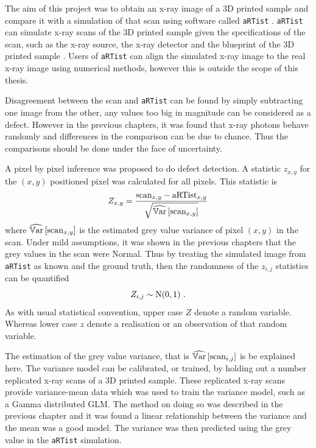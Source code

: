 The aim of this project was to obtain an x-ray image of a 3D printed sample and compare it with a simulation of that scan using software called \texttt{aRTist} \citep{bellon2007artist, jaenisch2008artist, bellon2012radiographic}. \texttt{aRTist} can simulate x-ray scans of the 3D printed sample given the specifications of the scan, such as the x-ray source, the x-ray detector and the blueprint of the 3D printed sample \citep{bellon2011simulation, deresch2012simulating}. Users of \texttt{aRTist} can align the simulated x-ray image to the real x-ray image using numerical methods, however this is outside the scope of this thesis.

Disagreement between the scan and \texttt{aRTist} can be found by simply subtracting one image from the other, any values too big in magnitude can be considered as a defect. However in the previous chapters, it was found that x-ray photons behave randomly and differences in the comparison can be due to chance. Thus the comparisons should be done under the face of uncertainty.

A pixel by pixel inference was proposed to do defect detection. A statistic $z_{x,y}$ for the $(x,y)$ positioned pixel was calculated for all pixels. This statistic is
\begin{equation}
    Z_{x,y} = 
    \dfrac{
        \text{scan}_{x,y} - \text{aRTist}_{x,y}
    }
    {
        \sqrt{\widehat{\operatorname{\mathbb{V}ar}}\left[\text{scan}_{x,y}\right]}
    }
\end{equation}
where $\widehat{\operatorname{\mathbb{V}ar}}\left[\text{scan}_{x,y}\right]$ is the estimated grey value variance of pixel $(x,y)$ in the scan. Under mild assumptions, it was shown in the previous chapters that the grey values in the scan were Normal. Thus by treating the simulated image from \texttt{aRTist} as known and the ground truth, then the randomness of the $z_{i,j}$ statistics can be quantified
\begin{equation}
Z_{i,j}\sim \operatorname{N}(0,1) \ .
\end{equation}
As with usual statistical convention, upper case $Z$ denote a random variable. Whereas lower case $z$ denote a realisation or an observation of that random variable.

The estimation of the grey value variance, that is $\widehat{\operatorname{\mathbb{V}ar}}\left[\text{scan}_{i,j}\right]$ is be explained here. The variance model can be calibrated, or trained, by holding out a number replicated x-ray scans of a 3D printed sample. These replicated x-ray scans provide variance-mean data which was used to train the variance model, such as a Gamma distributed GLM. The method on doing so was described in the previous chapter and it was found a linear relationship between the variance and the mean was a good model. The variance was then predicted using the grey value in the \texttt{aRTist} simulation.

